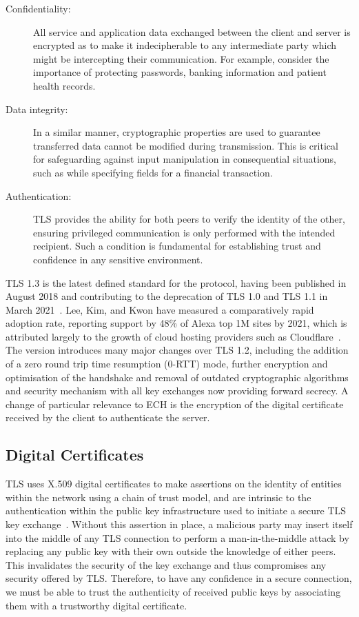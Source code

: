 \begin{description}
\item[Confidentiality:] All service and application data exchanged between the client and server is encrypted as to make it indecipherable to any intermediate party which might be intercepting their communication. For example, consider the importance of protecting passwords, banking information and patient health records.
\item[Data integrity:] In a similar manner, cryptographic properties are used to guarantee transferred data cannot be modified during transmission. This is critical for safeguarding against input manipulation in consequential situations, such as while specifying fields for a financial transaction.
\item[Authentication:] TLS provides the ability for both peers to verify the identity of the other, ensuring privileged communication is only performed with the intended recipient. Such a condition is fundamental for establishing trust and confidence in any sensitive environment.
\end{description}

TLS 1.3 is the latest defined standard for the protocol, having been published in August 2018 and contributing to the deprecation of TLS 1.0 and TLS 1.1 in March 2021~\cite{rfc8446, rfc8996}. Lee, Kim, and Kwon have measured a comparatively rapid adoption rate, reporting support by 48\% of Alexa top 1M sites by 2021, which is attributed largely to the growth of cloud hosting providers such as Cloudflare~\cite{holz2019era, lee2021tls}. The version introduces many major changes over TLS 1.2, including the addition of a zero round trip time resumption (0-RTT) mode, further encryption and optimisation of the handshake and removal of outdated cryptographic algorithms and security mechanism with all key exchanges now providing forward secrecy. A change of particular relevance to ECH is the encryption of the digital certificate received by the client to authenticate the server.

\subsection{Digital Certificates}\label{digial-circus}

TLS uses X.509 digital certificates to make assertions on the identity of entities within the network using a chain of trust model, and are intrinsic to the authentication within the public key infrastructure used to initiate a secure TLS key exchange~\cite{rfc4158}. Without this assertion in place, a malicious party may insert itself into the middle of any TLS connection to perform a man-in-the-middle attack by replacing any public key with their own outside the knowledge of either peers. This invalidates the security of the key exchange and thus compromises any security offered by TLS. Therefore, to have any confidence in a secure connection, we must be able to trust the authenticity of received public keys by associating them with a trustworthy digital certificate.

